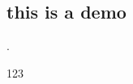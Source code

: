 
\subsection{this is a demo}.
\begin{definition}{1}

\end{definition}

\begin{lemma}{12}

\end{lemma}

\begin{corollary}{123}

\end{corollary}
\cite{同济高}